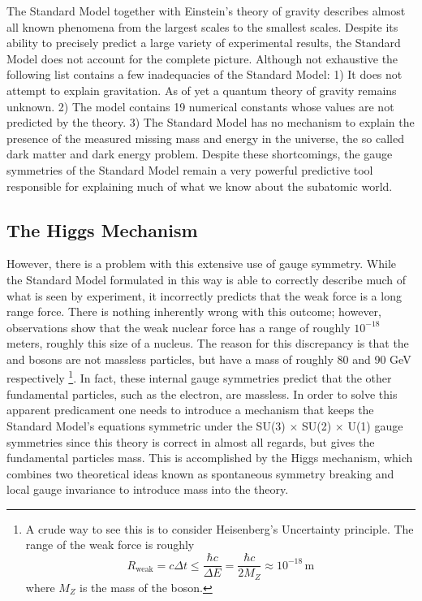 The Standard Model together with Einstein's theory of gravity describes almost
all known phenomena from the largest scales to the smallest scales. Despite
its ability to precisely predict a large variety of experimental results, the
Standard Model does not account for the complete picture. Although not exhaustive
the following list contains a few inadequacies of the Standard Model:
1) It does not attempt to explain gravitation. As of yet a quantum theory of
gravity remains unknown.
2) The model contains 19 numerical constants whose values are not predicted
by the theory.
3) The Standard Model has no mechanism to explain the presence of the measured
missing mass and energy in the universe, the so called dark matter and dark energy 
problem. Despite these shortcomings, the gauge symmetries of the Standard Model 
remain a very powerful predictive tool responsible for explaining much of
what we know about the subatomic world.


\subsection{The Higgs Mechanism}
\label{subsec:higgsmec}
However, there is a problem with this extensive use of gauge symmetry.
While the Standard Model formulated in this way
is able to correctly describe much of what is seen by experiment, it
incorrectly predicts that the weak force is a long range force. There is
nothing inherently wrong with this outcome; however, observations show 
that the weak nuclear force has a range of roughly $10^{-18}$ meters, roughly
this size of a nucleus. The reason for this discrepancy is that the
\WBosons and \ZBoson bosons are
not massless particles, but have a mass of roughly 80 and 90 GeV respectively
\footnote{A crude way to see this is to consider Heisenberg's Uncertainty
principle. The range of the weak force is roughly
\[
    R_{\text{weak}} = c\Delta t \le \frac{\hbar c}{\Delta E} = \frac{\hbar c}{2 M_{Z}} \approx 10^{-18}\, \text{m}
\]
where $M_{Z}$ is the mass of the \ZBoson boson.
}.
In fact, these internal gauge symmetries predict that the other fundamental
particles, such as the electron, are massless.
In order to solve this apparent predicament one needs to introduce a mechanism
that keeps the Standard Model's equations symmetric under the SU(3) $\times$
SU(2) $\times$ U(1) gauge symmetries since this theory is correct in
almost all regards, but gives the fundamental particles mass.
This is accomplished by the Higgs mechanism, which combines two theoretical ideas
known as spontaneous symmetry breaking and local gauge invariance to introduce
mass into the theory.

